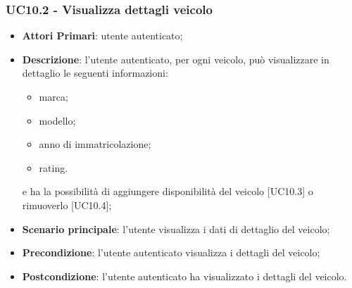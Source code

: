 \subsubsection{UC10.2 - Visualizza dettagli veicolo}
\begin{itemize}
	\item \textbf{Attori Primari}: utente autenticato;
	\item \textbf{Descrizione}: l'utente autenticato, per ogni veicolo, può visualizzare in dettaglio le seguenti informazioni:
	\begin{itemize}
		\item marca;
		\item modello;
		\item anno di immatricolazione;
		\item rating.
	\end{itemize}
	e ha la possibilità di aggiungere disponibilità del veicolo [UC10.3] o rimuoverlo [UC10.4];
	\item \textbf{Scenario principale}: l'utente visualizza i dati di dettaglio del veicolo;
	\item \textbf{Precondizione}: l'utente autenticato visualizza i dettagli del veicolo;
	\item \textbf{Postcondizione}: l'utente autenticato ha visualizzato i dettagli del veicolo.
\end{itemize}
